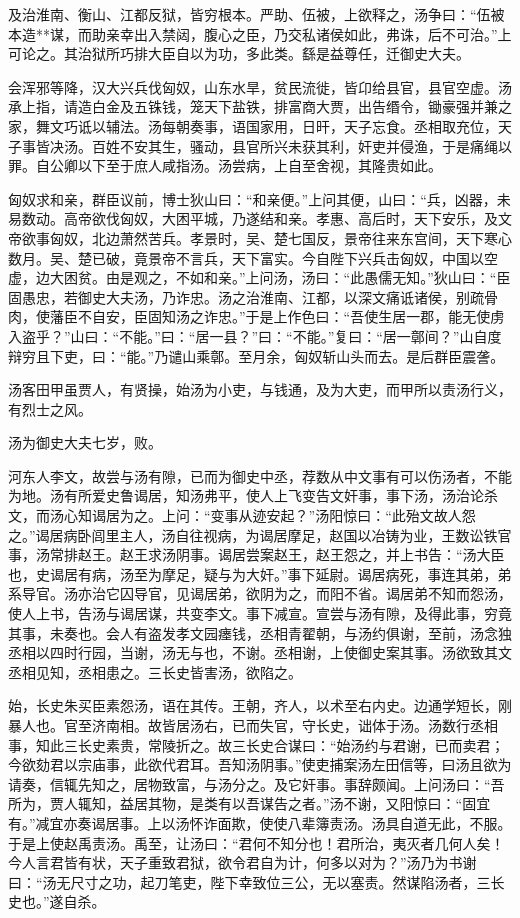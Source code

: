\documentclass[]{article}
\begin{document}
及治淮南、衡山、江都反狱，皆穷根本。严助、伍被，上欲释之，汤争曰：``伍被本造**谋，而助亲幸出入禁闼，腹心之臣，乃交私诸侯如此，弗诛，后不可治。''上可论之。其治狱所巧排大臣自以为功，多此类。繇是益尊任，迁御史大夫。

会浑邪等降，汉大兴兵伐匈奴，山东水旱，贫民流徙，皆卬给县官，县官空虚。汤承上指，请造白金及五铢钱，笼天下盐铁，排富商大贾，出告缗令，锄豪强并兼之家，舞文巧诋以辅法。汤每朝奏事，语国家用，日旰，天子忘食。丞相取充位，天子事皆决汤。百姓不安其生，骚动，县官所兴未获其利，奸吏并侵渔，于是痛绳以罪。自公卿以下至于庶人咸指汤。汤尝病，上自至舍视，其隆贵如此。

匈奴求和亲，群臣议前，博士狄山曰：``和亲便。''上问其便，山曰：``兵，凶器，未易数动。高帝欲伐匈奴，大困平城，乃遂结和亲。孝惠、高后时，天下安乐，及文帝欲事匈奴，北边萧然苦兵。孝景时，吴、楚七国反，景帝往来东宫间，天下寒心数月。吴、楚已破，竟景帝不言兵，天下富实。今自陛下兴兵击匈奴，中国以空虚，边大困贫。由是观之，不如和亲。''上问汤，汤曰：``此愚儒无知。''狄山曰：``臣固愚忠，若御史大夫汤，乃诈忠。汤之治淮南、江都，以深文痛诋诸侯，别疏骨肉，使藩臣不自安，臣固知汤之诈忠。''于是上作色曰：``吾使生居一郡，能无使虏入盗乎？''山曰：``不能。''曰：``居一县？''曰：``不能。''复曰：``居一鄣间？''山自度辩穷且下吏，曰：``能。''乃谴山乘鄣。至月余，匈奴斩山头而去。是后群臣震詟。

汤客田甲虽贾人，有贤操，始汤为小吏，与钱通，及为大吏，而甲所以责汤行义，有烈士之风。

汤为御史大夫七岁，败。

河东人李文，故尝与汤有隙，已而为御史中丞，荐数从中文事有可以伤汤者，不能为地。汤有所爱史鲁谒居，知汤弗平，使人上飞变告文奸事，事下汤，汤治论杀文，而汤心知谒居为之。上问：``变事从迹安起？''汤阳惊曰：``此殆文故人怨之。''谒居病卧闾里主人，汤自往视病，为谒居摩足，赵国以冶铸为业，王数讼铁官事，汤常排赵王。赵王求汤阴事。谒居尝案赵王，赵王怨之，并上书告：``汤大臣也，史谒居有病，汤至为摩足，疑与为大奸。''事下延尉。谒居病死，事连其弟，弟系导官。汤亦治它囚导官，见谒居弟，欲阴为之，而阳不省。谒居弟不知而怨汤，使人上书，告汤与谒居谋，共变李文。事下减宣。宣尝与汤有隙，及得此事，穷竟其事，未奏也。会人有盗发孝文园瘗钱，丞相青翟朝，与汤约俱谢，至前，汤念独丞相以四时行园，当谢，汤无与也，不谢。丞相谢，上使御史案其事。汤欲致其文丞相见知，丞相患之。三长史皆害汤，欲陷之。

始，长史朱买臣素怨汤，语在其传。王朝，齐人，以术至右内史。边通学短长，刚暴人也。官至济南相。故皆居汤右，已而失官，守长史，诎体于汤。汤数行丞相事，知此三长史素贵，常陵折之。故三长史合谋曰：``始汤约与君谢，已而卖君；今欲劾君以宗庙事，此欲代君耳。吾知汤阴事。''使吏捕案汤左田信等，曰汤且欲为请奏，信辄先知之，居物致富，与汤分之。及它奸事。事辞颇闻。上问汤曰：``吾所为，贾人辄知，益居其物，是类有以吾谋告之者。''汤不谢，又阳惊曰：``固宜有。''减宜亦奏谒居事。上以汤怀诈面欺，使使八辈簿责汤。汤具自道无此，不服。于是上使赵禹责汤。禹至，让汤曰：``君何不知分也！君所治，夷灭者几何人矣！今人言君皆有状，天子重致君狱，欲令君自为计，何多以对为？''汤乃为书谢曰：``汤无尺寸之功，起刀笔吏，陛下幸致位三公，无以塞责。然谋陷汤者，三长史也。''遂自杀。
\end{document}

